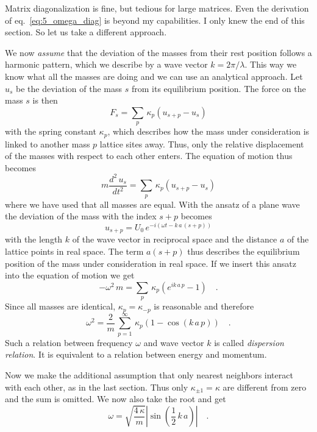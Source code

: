 Matrix diagonalization is fine, but tedious for large matrices. Even the derivation of eq.~\ref{eq:5_omega_diag} is beyond my capabilities. I only knew the end of this section. So let us take a different approach.

We now \emph{assume} that the deviation of the masses from their rest position follows a harmonic pattern, which we describe by a wave vector $k = 2 \pi / \lambda$. This way we know what all the masses are doing and we can use an analytical approach.
Let $u_s$ be the deviation of the mass $s$ from its equilibrium position. The force on the mass $s$ is then
\begin{equation}
  F_s = \sum_p \, \kappa_p \left( u_{s+p} - u_s \right)
\end{equation}
with the spring constant $\kappa_p$, which describes how the mass under consideration is  linked to another mass  $p$ lattice sites away. Thus, only the relative displacement of the masses with respect to each other enters. The equation of motion thus becomes
\begin{equation}
    m \frac{d^2 \, u_s}{dt^2} = \sum_p \, \kappa_p \left( u_{s+p} - u_s \right)
\end{equation}
where we have used that all masses are equal. With the ansatz of a plane wave the deviation of the mass with the index $s+p$ becomes
\begin{equation}
    u_{s+p} = U_0 \, e^{-i ( \omega t - k \, a \, (s+p) )}
\end{equation}
with the length $k$ of the wave vector in reciprocal space and the distance $a$ of the lattice points in real space. The term $a (s+p)$ thus describes the equilibrium position of the mass under consideration in real space. If we insert this ansatz into the equation of motion we get
\begin{equation}
- \omega^2 \, m = \sum_p \, \kappa_p \left( e^{i k \, a \, p} - 1 \right) \quad .
\end{equation}
Since all masses are identical, $\kappa_p = \kappa_{-p}$ is reasonable and therefore
\begin{equation}
    \omega^2 = \frac{2}{m} \, \sum_{p=1}^\infty \, \kappa_p \left( 1 - \cos ( k \, a \, p ) \right) \quad .
\end{equation}
Such a relation between frequency $\omega$ and wave vector $k$ is called  \emph{dispersion relation}. It is equivalent to a relation between energy and momentum.

Now we make the additional assumption that only nearest neighbors interact with each other, as in the last section. Thus only $\kappa_{\pm 1} = \kappa $ are different from zero and the sum is omitted. We now also take the root and get
\begin{equation}
\omega = \sqrt{\frac{4 \, \kappa}{m}} \left| \sin \left(\frac{1}{2} \, k \, a \right) \right|  \quad .
\end{equation}

